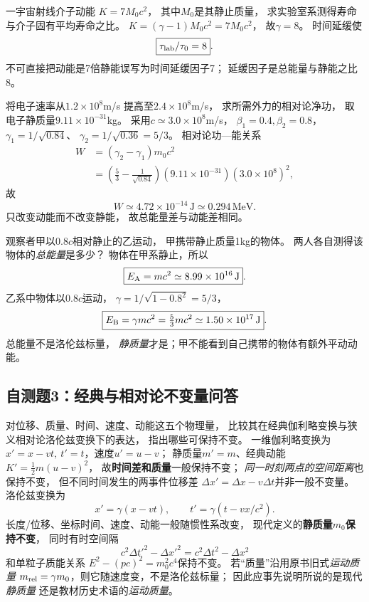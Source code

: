 \problemtext 一宇宙射线介子动能
$K=7M_0c^2$，
其中$M_0$是其静止质量，
求实验室系测得寿命与介子固有平均寿命之比。
\workings
$K=(\gamma-1)M_0c^2=7M_0c^2$，
故$\gamma=8$。
时间延缓使
\[
\boxed{\tau_{\rm lab}/\tau_0=8}.
\]
\crosscheck 不可直接把动能是7倍静能误写为时间延缓因子7；
延缓因子是总能量与静能之比8。

\problemtext 将电子速率从$1.2\times10^8$m/s
提高至$2.4\times10^8$m/s，
求所需外力的相对论净功，
取电子静质量$9.11\times10^{-31}$kg。
\workings
采用$c\simeq3.0\times10^8$m/s，
$\beta_1=0.4,\beta_2=0.8$，
$\gamma_1=1/\sqrt{0.84}$、
$\gamma_2=1/\sqrt{0.36}=5/3$。
相对论功—能关系
\[
\begin{aligned}
W&=(\gamma_2-\gamma_1)m_0c^2\\
&=\left(\frac53-\frac1{\sqrt{0.84}}\right)
(9.11\times10^{-31})(3.0\times10^8)^2,
\end{aligned}
\]
故
\[
\boxed{W\simeq4.72\times10^{-14}\,\mathrm J
\simeq0.294\,\mathrm{MeV}}.
\]
\crosscheck 只改变动能而不改变静能，
故总能量差与动能差相同。

\problemtext 观察者甲以$0.8c$相对静止的乙运动，
甲携带静止质量1kg的物体。
两人各自测得该物体的\emph{总能量}是多少？
\workings
物体在甲系静止，所以
\[
\boxed{E_{\rm A}=mc^2
\simeq8.99\times10^{16}\,\mathrm J}.
\]
乙系中物体以$0.8c$运动，
$\gamma=1/\sqrt{1-0.8^2}=5/3$，
\[
\boxed{E_{\rm B}=\gamma mc^2
=\tfrac53mc^2
\simeq1.50\times10^{17}\,\mathrm J}.
\]
\crosscheck 总能量不是洛伦兹标量，
\emph{静质量}才是；甲不能看到自己携带的物体有额外平动动能。

\subsection{自测题3：经典与相对论不变量问答}

\problemtext 对位移、质量、时间、速度、动能这五个物理量，
比较其在经典伽利略变换与狭义相对论洛伦兹变换下的表达，
指出哪些可保持不变。
\workings
一维伽利略变换为
$x'=x-vt,\ t'=t$，速度$u'=u-v$；
静质量$m'=m$、经典动能
$K'=\tfrac12m(u-v)^2$，
故\textbf{时间差和质量}一般保持不变；
\emph{同一时刻两点的空间距离}也保持不变，
但不同时间发生的两事件位移差
$\Delta x'=\Delta x-v\Delta t$并非一般不变量。
洛伦兹变换为
\[
x'=\gamma(x-vt),\qquad
t'=\gamma(t-vx/c^2).
\]
长度/位移、坐标时间、速度、动能一般随惯性系改变，
现代定义的\textbf{静质量$m_0$保持不变}，
同时有时空间隔
\[
\boxed{c^2\Delta t'^2-\Delta x'^2
=c^2\Delta t^2-\Delta x^2}
\]
和单粒子质能关系
$\boxed{E^2-(pc)^2=m_0^2c^4}$保持不变。
\crosscheck 若“质量”沿用原书旧式\emph{运动质量}
$m_{\rm rel}=\gamma m_0$，则它随速度变，不是洛伦兹标量；
因此应事先说明所说的是现代\emph{静质量}
还是教材历史术语的\emph{运动质量}。
